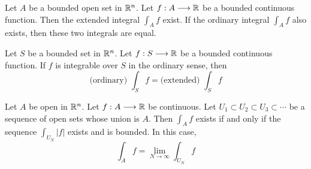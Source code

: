 \begin{theorem}
    Let $A$ be a bounded open set in $\mathbb{R}^n$. Let $f:A\longrightarrow \mathbb{R}$ be a bounded continuous function. Then the extended integral $\int_Af$ exist. 
    If the ordinary integral $\int_Af$ also exists, then these two integrals are equal.
\end{theorem}

\begin{corollary}
    Let $S$ be a bounded set in $\mathbb{R}^n$. Let $f:S\longrightarrow \mathbb{R}$ be a bounded continuous function. If $f$ is integrable over $S$ in the ordinary sense, then $$\text{(ordinary) }\int_Sf=\text{(extended) }\int_Sf$$
\end{corollary}

\begin{theorem}\label{Equivalent definition of extended intrgral 2}
    Let $A$ be open in $\mathbb{R}^n$. Let $f:A\longrightarrow \mathbb{R}$ be continuous. Let $U_1\subset U_2\subset U_3\subset \cdots$ be a sequence of open sets whose union is $A$. Then $\int_Af$ exists if and only if the sequence $\int_{U_N}|f|$ exists and is bounded. In this case, $$
    \int_Af=\lim_{N\to\infty}\int_{U_N}f$$
\end{theorem}


